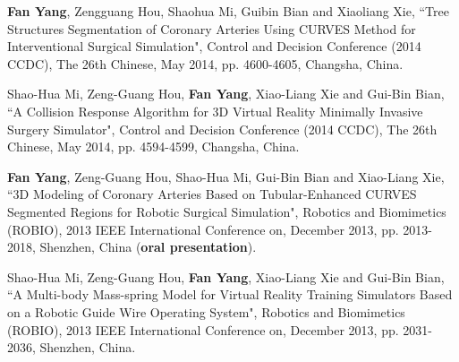 \begin{publications}{99}
\item \textbf{Fan Yang}, Zengguang Hou, Shaohua Mi, Guibin Bian and Xiaoliang Xie, ``Tree Structures Segmentation of Coronary Arteries Using CURVES Method for Interventional Surgical Simulation", Control and Decision Conference (2014 CCDC), The 26th Chinese, May 2014, pp. 4600-4605, Changsha, China.%

\item Shao-Hua Mi, Zeng-Guang Hou, \textbf{Fan Yang}, Xiao-Liang Xie and Gui-Bin Bian, ``A Collision Response Algorithm for 3D Virtual Reality Minimally Invasive Surgery Simulator", Control and Decision Conference (2014 CCDC), The 26th Chinese, May 2014, pp. 4594-4599, Changsha, China.%

\item \textbf{Fan Yang}, Zeng-Guang Hou, Shao-Hua Mi, Gui-Bin Bian and Xiao-Liang Xie, ``3D Modeling of Coronary Arteries Based on Tubular-Enhanced CURVES Segmented Regions for Robotic Surgical Simulation", Robotics and Biomimetics (ROBIO), 2013 IEEE International Conference on, December 2013, pp. 2013-2018, Shenzhen, China (\textbf{oral presentation}).%

\item Shao-Hua Mi, Zeng-Guang Hou, \textbf{Fan Yang}, Xiao-Liang Xie and Gui-Bin Bian, ``A Multi-body Mass-spring Model for Virtual Reality Training Simulators Based on a Robotic Guide Wire Operating System", Robotics and Biomimetics (ROBIO), 2013 IEEE International Conference on, December 2013, pp. 2031-2036, Shenzhen, China.%

\end{publications}
